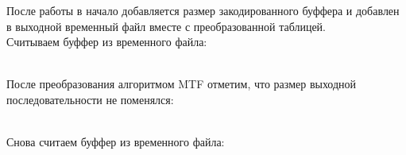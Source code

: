 После работы в начало добавляется размер закодированного буффера и добавлен в выходной временный файл вместе с преобразованной таблицей.\\

Считываем буффер из временного файла:

{} \\

После преобразования алгоритмом MTF отметим, что размер выходной последовательности не поменялся:

{}\\

Снова считаем буффер из временного файла:

